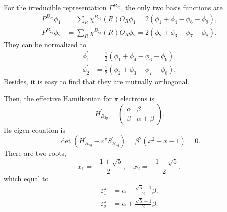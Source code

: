 \documentclass[a4paper]{book}
\newcommand{\Hp}{H^\prime}
\newcommand{\Sp}{S^\prime}
\begin{document}
\begin{solution}
\begin{enumerate}[label=(\alph*)]
		For the irreducible representation $\Gamma^{B_{2g}}$, the only two basis functions are
		\begin{align*}
			P^{B_{2g}}\phi_1 &= \sum_{R} \chi^{B_{2g}}(R) O_R \phi_1 = 2(\phi_1 + \phi_4 - \phi_6 - \phi_9 ), \\
			P^{B_{2g}}\phi_2 &= \sum_{R} \chi^{B_{2g}}(R) O_R \phi_2 = 2(\phi_2 + \phi_3 - \phi_7 - \phi_8 ).	
		\end{align*}
		They can be normalized to
		\begin{align*}
			\phi^\prime_1 &= \frac{1}{2}(\phi_1 + \phi_4 - \phi_6 - \phi_9), \\
			\phi^\prime_2 &= \frac{1}{2}(\phi_2 + \phi_3 - \phi_7 - \phi_8).
		\end{align*}
		Besides, it is easy to find that they are mutually orthogonal.
		
		Then, the effective Hamiltonian for $\pi$ electrons is
		\begin{equation*}
			H^\prime_{B_{2g}} = \begin{pmatrix}
				\alpha	&	\beta	\\
				\beta	&	\alpha+\beta
				\end{pmatrix}.				
		\end{equation*}
		Its eigen equation is		
		\begin{equation}
			\det(\Hp_{B_{2g}}-\varepsilon^\pi \Sp_{B_{2g}}) = \beta^2 ( x^2 + x - 1 ) = 0.
		\end{equation}
		There are two roots,
		\begin{equation}
			x_1 = \frac{-1+\sqrt{5}}{2}, \quad x_2 = \frac{-1-\sqrt{5}}{2},
		\end{equation}
		which equal to
		\begin{align}
			\varepsilon^\pi_1 &= \alpha - \frac{\sqrt{5}-1}{2}\beta, \\
			\varepsilon^\pi_2 &= \alpha + \frac{\sqrt{5}+1}{2}\beta.
		\end{align}
		

\end{enumerate}
\end{solution}
\end{document}
